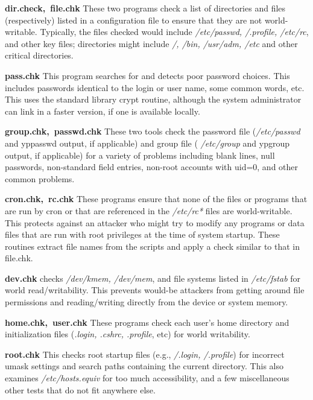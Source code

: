 \begin{description}
\item{\bf dir.check,\ file.chk}
These two programs check a list of directories and files
(respectively) listed in a configuration file to ensure that they are
not world-writable.  Typically, the files checked would include 
{\it/etc/passwd, /.profile, /etc/rc},
and other key files; directories
might include  {\it/, /bin, /usr/adm, /etc}
and other critical
directories.

\item{\bf pass.chk}
This program searches for and detects poor password choices.  This
includes passwords identical to the login or user name, some common
words, etc.  This uses the standard library  crypt routine,
although the system administrator can link in a faster version, if one
is available locally.

\item{\bf group.chk,\ passwd.chk}
These two tools check the password file ({\it /etc/passwd}
and
{\sf yppasswd}
output, if applicable) and group file (
{\it /etc/group}
and 
{\sf ypgroup}
output, if applicable) for a variety of problems
including blank lines, null passwords, non-standard field entries,
non-root accounts with uid=0, and other common problems.

\item{\bf cron.chk,\ rc.chk}
These programs ensure that none of the files or programs that are run
by  {\sf cron}
or that are referenced in the
{\it /etc/rc*}
files are
world-writable.  This protects against an attacker who might try to
modify any programs or data files that are run with root privileges at
the time of system startup.  These routines extract file names from
the scripts and apply a check similar to that in {\sf file.chk}.

\item{\bf dev.chk}
checks  {\it /dev/kmem, /dev/mem}, and file systems listed in 
{\it /etc/fstab}
for world read/writability.  This prevents would-be
attackers from getting around file permissions and reading/writing
directly from the device or system memory.

\item{\bf home.chk,\ user.chk}
These programs check each user's home directory and initialization
files ({\it .login, .cshrc, .profile}, etc) for world writability.

\item{\bf root.chk}
This checks root startup files (e.g.,  {\it /.login, /.profile}) for
incorrect {\sf umask}
settings and search paths containing the current
directory.  This also examines  {\it /etc/hosts.equiv}
for too much
accessibility, and a few miscellaneous other tests that do not fit
anywhere else.


\end{description}
